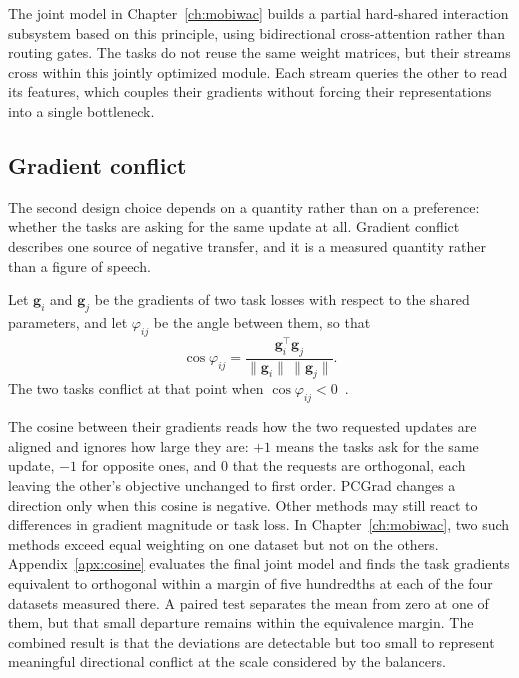 The joint model in Chapter~\ref{ch:mobiwac} builds a partial hard-shared interaction
subsystem based on this principle, using bidirectional cross-attention rather than
routing gates. The tasks do not reuse the same weight matrices, but their streams
cross within this jointly optimized module. Each stream queries the other to read its
features, which couples their gradients without forcing their representations into a
single bottleneck.


\subsection{Gradient conflict}

The second design choice depends on a quantity rather than on a preference: whether the
tasks are asking for the same update at all. Gradient conflict describes one source of
negative transfer, and it is a measured quantity rather than a figure of speech.

\begin{definition}\label{def:fund:conflict}
    Let $\mathbf{g}_i$ and $\mathbf{g}_j$ be the gradients of two task losses with respect
    to the shared parameters, and let $\varphi_{ij}$ be the angle between them, so that
    \begin{equation}\label{eq:fund:cosine}
        \cos\varphi_{ij}
        = \frac{\mathbf{g}_i^{\top}\mathbf{g}_j}
        {\lVert \mathbf{g}_i\rVert\,\lVert \mathbf{g}_j\rVert}.
    \end{equation}
    The two tasks conflict at that point when $\cos\varphi_{ij}<0$~\cite{yu2020pcgrad}.
\end{definition}

The cosine between their gradients reads how the two requested updates are aligned and
ignores how large they are: $+1$ means the tasks ask for the same update, $-1$ for
opposite ones, and $0$ that the requests are orthogonal, each leaving the other's
objective unchanged to first order. PCGrad changes a direction only when this cosine is
negative. Other methods may still react to differences in gradient magnitude or task
loss. In Chapter~\ref{ch:mobiwac}, two such methods exceed equal weighting on one
dataset but not on the others. Appendix~\ref{apx:cosine} evaluates the final joint
model and finds the task gradients equivalent to orthogonal within a margin of five
hundredths at each of the four datasets measured there. A paired test separates the mean
from zero at one of them, but that small departure remains within the equivalence margin.
The combined result is that the deviations are detectable but too small to represent
meaningful directional conflict at the scale considered by the balancers.

